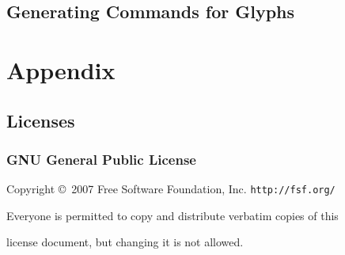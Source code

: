 \documentclass{article}
\begin{document}
\subsection{Generating Commands for \emmentaler Glyphs}
\label{subsec:generating_commands_emmentaler}


\pagebreak
\appendix
\small

\section{Appendix}
\subsection{Licenses}

\subsubsection{GNU General Public License}
\label{subsubsec:gpl}

\begin{center}
{\parindent 0in

Copyright \copyright\  2007 Free Software Foundation, Inc. \texttt{http://fsf.org/}

\bigskip
Everyone is permitted to copy and distribute verbatim copies of this

license document, but changing it is not allowed.}

\end{center}
\end{document}
